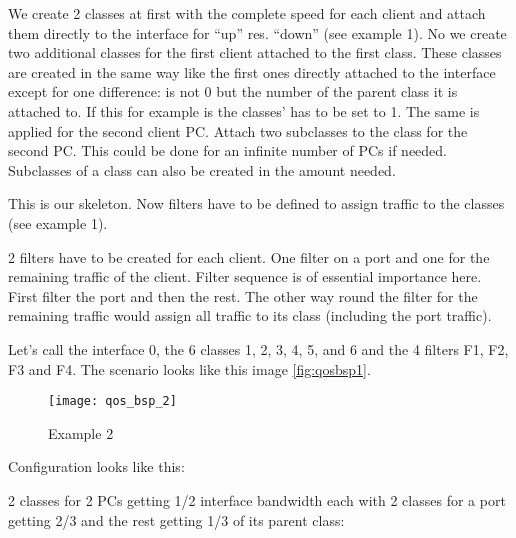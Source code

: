   We create 2 classes at first with the complete speed for each client
   and attach them directly to the interface for ``up'' res. ``down''
   (see example 1). No we create two additional classes for the first
   client attached to the first class. These classes are created in the
   same way like the first ones directly attached to the interface except
   for one difference:  is not 0 but
   the number of the parent class it is attached to. If this for example
   is  the classes'  has to
   be set to 1. The same is applied for the second client PC. Attach two
   subclasses to the class for the second PC. This could be done for an
   infinite number of PCs if needed. Subclasses of a class can also be
   created in the amount needed.

   This is our skeleton. Now filters have to be defined to assign traffic
   to the classes (see example 1).

   2 filters have to be created for each client. One filter on a port and
   one for the remaining traffic of the client. Filter sequence is of
   essential importance here. First filter the port and then the rest.
   The other way round the filter for the remaining traffic would assign
   all traffic to its class (including the port traffic).

   Let's call the interface 0, the 6 classes 1, 2, 3, 4, 5, and 6 and the
   4 filters F1, F2, F3 and F4. The scenario looks like this image \ref{fig:qosbsp1}.

   \begin{figure}[htbp]
     \centering
     \texttt{[image: qos\_bsp\_2]}%
     \caption{Example 2}
   \end{figure}

   Configuration looks like this:

   2 classes for 2 PCs getting 1/2 interface bandwidth each with 2 classes for a port
   getting 2/3 and the rest getting 1/3 of its parent class:

